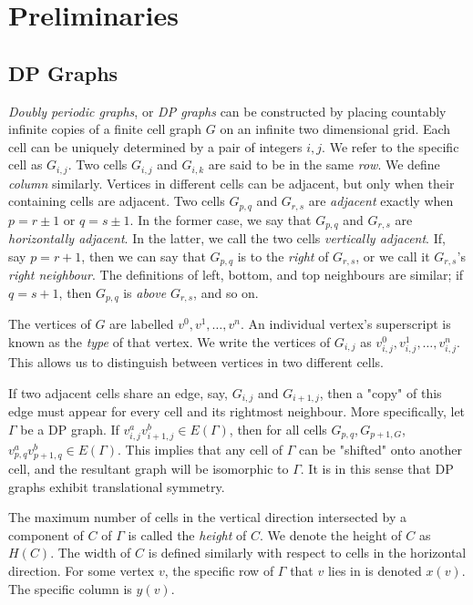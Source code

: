 \documentclass[letterpaper]{article}
\begin{document}
\section{Preliminaries}

\subsection{DP Graphs}
\emph{Doubly periodic graphs}, or \emph{DP graphs} can be constructed by placing countably infinite copies of a finite cell graph $G$ on an infinite two dimensional grid.
Each cell can be uniquely determined by a pair of integers $i,j$.
We refer to the specific cell as $G_{i,j}$.
Two cells $G_{i,j}$ and $G_{i,k}$ are said to be in the same \emph{row}.
We define \emph{column} similarly.
Vertices in different cells can be adjacent, but only when their containing cells are adjacent.
Two cells $G_{p,q}$ and $G_{r,s}$ are \emph{adjacent} exactly when $p = r \pm 1$ or $q = s \pm 1$.
In the former case, we say that $G_{p,q}$ and $G_{r,s}$ are \emph{horizontally adjacent}.
In the latter, we call the two cells \emph{vertically adjacent}.
If, say $p = r + 1$, then we can say that $G_{p,q}$ is to the \emph{right} of $G_{r,s}$, or we call it $G_{r,s}$'s \emph{right neighbour}.
The definitions of left, bottom, and top neighbours are similar; if $q = s + 1$, then $G_{p,q}$ is \emph{above} $G_{r,s}$, and so on.

The vertices of $G$ are labelled $v^0, v^1, \ldots, v^n$.
An individual vertex's superscript is known as the \emph{type} of that vertex.
We write the vertices of $G_{i,j}$ as $v^0_{i,j}, v^1_{i,j}, \ldots, v^n_{i,j}$.
This allows us to distinguish between vertices in two different cells.

If two adjacent cells share an edge, say, $G_{i,j}$ and $G_{i+1,j}$, then a "copy" of this edge must appear for every cell and its rightmost neighbour.
More specifically, let $\Gamma$ be a DP graph.
If $v_{i,j}^av_{i+1, j}^b \in E(\Gamma)$, then for all cells $G_{p,q},G_{p+1,G}$, $v_{p,q}^a v_{p+1,q}^b \in E(\Gamma)$.
This implies that any cell of $\Gamma$ can be "shifted" onto another cell, and the resultant graph will be isomorphic to $\Gamma$.
It is in this sense that DP graphs exhibit translational symmetry.

The maximum number of cells in the vertical direction intersected by a component of $C$ of $\Gamma$ is called the \emph{height} of $C$.
We denote the height of $C$ as $H(C)$.
The width of $C$ is defined similarly with respect to cells in the horizontal direction.
For some vertex $v$, the specific row of $\Gamma$ that $v$ lies in is denoted $x(v)$.
The specific column is $y(v)$.
\end{document}
